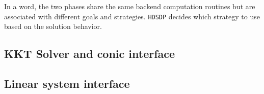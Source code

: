 In a word, the two phases share the same backend computation routines but are
associated with different goals and strategies. {{\texttt{HDSDP}}} decides
which strategy to use based on the solution behavior.


\subsection{KKT Solver and conic interface}


\subsection{Linear system interface}

%
%
